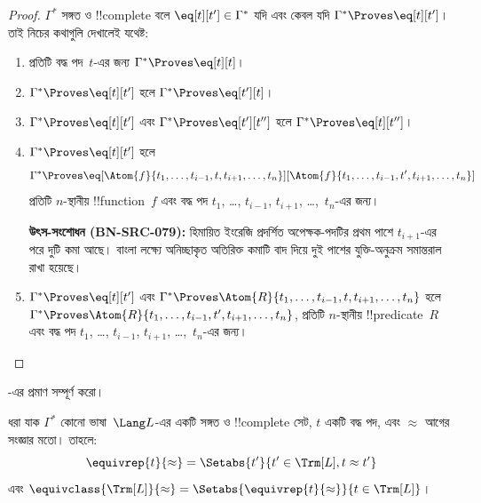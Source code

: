 \documentclass[../../../include/open-logic-section]{subfiles}
\begin{document}
\begin{proof}
$\Gamma^*$ সঙ্গত ও !!{complete} বলে $\eq[t][t'] \in \Gamma^*$ যদি এবং
কেবল যদি $\Gamma^* \Proves \eq[t][t']$। তাই নিচের কথাগুলি দেখালেই যথেষ্ট:
\begin{enumerate}
\item প্রতিটি বদ্ধ পদ~$t$-এর জন্য $\Gamma^* \Proves \eq[t][t]$।
\item $\Gamma^* \Proves \eq[t][t']$ হলে $\Gamma^* \Proves \eq[t'][t]$।
\item $\Gamma^* \Proves \eq[t][t']$ এবং $\Gamma^* \Proves
  \eq[t'][t'']$ হলে $\Gamma^* \Proves \eq[t][t'']$।
\item $\Gamma^* \Proves \eq[t][t']$ হলে
\[
\Gamma^* \Proves
\eq[\Atom{f}{t_1,\dots,t_{i-1},t,t_{i+1},\dots,t_n}][\Atom{f}{t_1,\dots,t_{i-1},t',t_{i+1},\dots,t_n}]
\]
প্রতিটি $n$-স্থানীয় !!{function}~$f$ এবং বদ্ধ পদ $t_1$, \dots,
$t_{i-1}$, $t_{i+1}$, \dots,~$t_n$-এর জন্য।%
\par\smallskip\noindent\textnormal{\small\textbf{উৎস-সংশোধন (BN-SRC-079):} হিমায়িত ইংরেজি প্রদর্শিত অপেক্ষক-পদটির প্রথম পাশে $t_{i+1}$-এর পরে দুটি কমা আছে। বাংলা লক্ষ্যে অনিচ্ছাকৃত অতিরিক্ত কমাটি বাদ দিয়ে দুই পাশের যুক্তি-অনুক্রম সমান্তরাল রাখা হয়েছে।} %
\item $\Gamma^* \Proves \eq[t][t']$ এবং
$\Gamma^* \Proves
\Atom{R}{t_1,\dots,t_{i-1},t,t_{i+1},\dots,t_n}$ হলে
$\Gamma^* \Proves \Atom{R}{t_1,\dots,t_{i-1},t',t_{i+1},\dots,t_n}$,
প্রতিটি $n$-স্থানীয় !!{predicate}~$R$ এবং বদ্ধ পদ $t_1$, \dots,
$t_{i-1}$, $t_{i+1}$, \dots,~$t_n$-এর জন্য।
\end{enumerate}
\end{proof}

\begin{prob}
-এর প্রমাণ সম্পূর্ণ করো।
\end{prob}

\begin{defn}
ধরা যাক $\Gamma^*$ কোনো ভাষা~$\Lang L$-এর একটি সঙ্গত ও !!{complete}
সেট, $t$ একটি বদ্ধ পদ, এবং $\approx$ আগের সংজ্ঞার মতো। তাহলে:
\[
\equivrep{t}{\approx} = \Setabs{t'}{t'\in \Trm[L], t \approx t'}
\]
এবং $\equivclass{\Trm[L]}{\approx} = \Setabs{\equivrep{t}{\approx}}{t \in \Trm[L]}$।
\end{defn}
\end{document}
